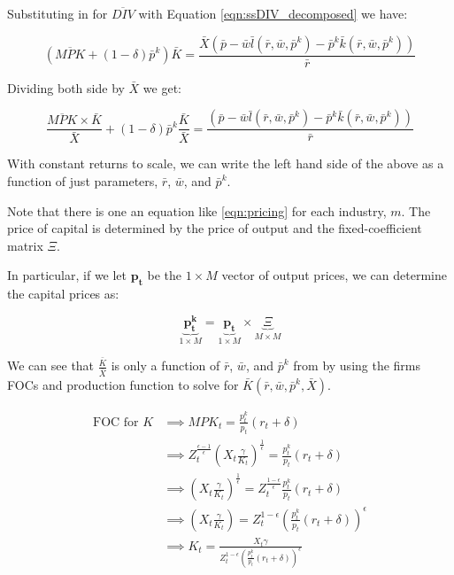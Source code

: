 \documentclass[letterpaper,12pt]{article}
\theoremstyle{definition}
\begin{document}
Substituting in for $\overline{DIV}$ with Equation \ref{eqn:ssDIV_decomposed} we have:

\begin{equation}
\left(\overline{MPK} + (1-\delta)\bar{p}^{k}\right)\bar{K} =  \frac{\bar{X}\left(\bar{p} - \bar{w}\bar{l}(\bar{r},\bar{w},\bar{p}^{k}) - \bar{p}^{k}\bar{k}(\bar{r},\bar{w},\bar{p}^{k})\right)}{\bar{r}}
\end{equation} 

Dividing both side by $\bar{X}$ we get:


\begin{equation}
\label{eqn:pricing}
\frac{\overline{MPK} \times \bar{K}}{\bar{X}} + (1-\delta)\bar{p}^{k}\frac{\bar{K}}{\bar{X}} =  \frac{\left(\bar{p} - \bar{w}\bar{l}(\bar{r},\bar{w},\bar{p}^{k}) - \bar{p}^{k}\bar{k}(\bar{r},\bar{w},\bar{p}^{k})\right)}{\bar{r}}
\end{equation} 

With constant returns to scale, we can write the left hand side of the above as a function of just parameters, $\bar{r}$, $\bar{w}$, and $\bar{p}^{k}$.

Note that there is one an equation like \ref{eqn:pricing} for each industry, $m$.  The price of capital is determined by the price of output and the fixed-coefficient matrix $\Xi$.

In particular, if we let $\boldsymbol{p_{t}}$ be the $1\times M$ vector of output prices, we can determine the capital prices as:

\begin{equation}
\label{eqn:capital_prices}
\underbrace{\boldsymbol{p^{k}_{t}}}_{1\times M} =\underbrace{\boldsymbol{p_{t}}}_{1\times M} \times  \underbrace{\Xi}_{M\times M}
\end{equation}

We can see that $\frac{\bar{K}}{\bar{X}}$ is only a function of $\bar{r}$, $\bar{w}$, and $\bar{p}^{k}$ from by using the firms FOCs and production function to solve for $\bar{K}(\bar{r},\bar{w},\bar{p}^{k},\bar{X})$.

\begin{equation}
\begin{split}
\text{FOC for $K$}& \implies MPK_{t} = \frac{p^{k}_{t}}{p_{t}}(r_{t}+\delta)\\
& \implies Z_{t}^{\frac{\epsilon-1}{\epsilon}}\left(X_{t}\frac{\gamma}{K_{t}}\right)^{\frac{1}{\epsilon}} = \frac{p^{k}_{t}}{p_{t}}(r_{t}+\delta)\\
& \implies\left(X_{t}\frac{\gamma}{K_{t}}\right)^{\frac{1}{\epsilon}} =  Z_{t}^{\frac{1-\epsilon}{\epsilon}}\frac{p^{k}_{t}}{p_{t}}(r_{t}+\delta) \\
& \implies\left(X_{t}\frac{\gamma}{K_{t}}\right) =  Z_{t}^{1-\epsilon}\left(\frac{p^{k}_{t}}{p_{t}}(r_{t}+\delta)\right)^{\epsilon} \\
& \implies K_{t} = \frac{X_{t}\gamma}{Z_{t}^{1-\epsilon}\left(\frac{p^{k}_{t}}{p_{t}}(r_{t}+\delta)\right)^{\epsilon}} \\
\end{split}
\end{equation}
\end{document}
